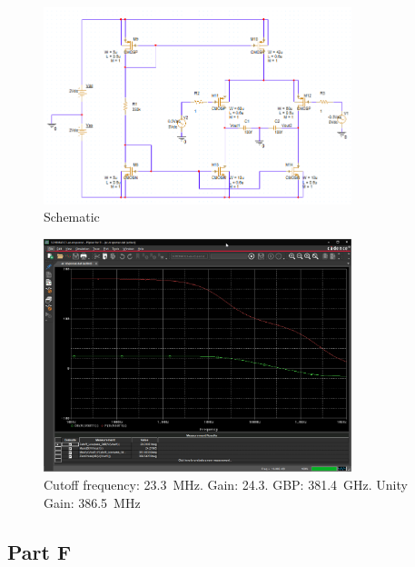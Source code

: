 \documentclass{article}
\newcommand \imgWidthFactor{0.8}
\begin{document}
		\begin{figure}[H]
			\centering
			\includegraphics[width=\imgWidthFactor\textwidth]{e2}
			\caption{Schematic}
		\end{figure}

		\begin{figure}[H]
			\centering
			\includegraphics[width=\imgWidthFactor\textwidth]{e3}
			\caption{Cutoff frequency: \SI{23.3}{\MHz}. Gain: \SI{24.3}{}. GBP: \SI{381.4}{\GHz}. Unity Gain: \SI{386.5}{\MHz}}
		\end{figure}

	\subsection{Part F}
\end{document}
